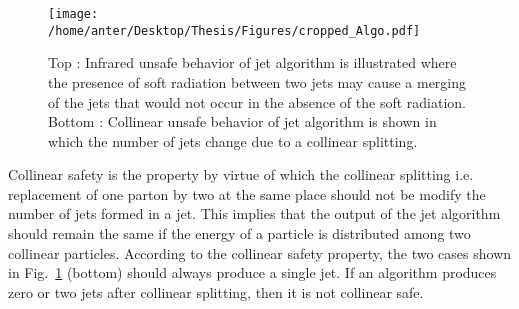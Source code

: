 \begin{figure}[h!]
\begin{center} 
\texttt{[image: /home/anter/Desktop/Thesis/Figures/cropped\_Algo.pdf]}
\caption[Effects of emission of infrared radiations and collinear splitting in jet algorithms.]{Top : Infrared unsafe behavior of jet algorithm is illustrated where the presence of soft radiation between two jets may cause a merging of the jets that would not occur in the absence of the soft radiation. Bottom : Collinear unsafe behavior of jet algorithm is shown in which the number of jets change due to a collinear splitting\footnotemark.}
\label{fig:IRC}
\end{center}
\end{figure}  Collinear safety is the property by virtue of which the collinear splitting i.e. replacement of one parton by two at the same place should not be modify the number of jets formed in a jet. This implies that the output of the jet algorithm should remain the same if the energy of a particle is distributed among two collinear particles. According to the collinear safety property, the two cases shown in Fig.~\ref{fig:IRC} (bottom) should always produce a single jet. If an algorithm produces zero or two jets after collinear splitting, then it is not collinear safe. 

